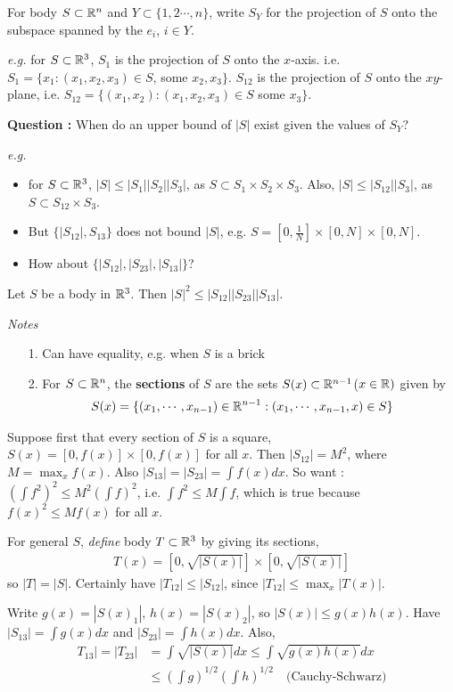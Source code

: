 \documentclass[12pt,a4paper]{report}
\newenvironment{proof}
{\begin{changemargin}{1cm}{0.5cm}
	}%
	{\end{changemargin}
}
\begin{document}
For body $S\subset \mathbb{R}^n$ and $Y\subset \{1,2\cdots, n\}$, write $S_Y$ for the projection of $S$ onto the subspace spanned by the $e_i$, $i\in Y$.

\textit{e.g.} for $S\subset \mathbb{R}^3$, $S_1$ is the projection of $S$ onto the $x$-axis. i.e. $S_1 = \{x_1 : (x_1, x_2, x_3) \in S$, some $x_2, x_3 \}$. $S_{12}$ is the projection of $S$ onto the $xy$-plane, i.e. $S_{12} = \{(x_1, x_2) : (x_1, x_2, x_3) \in S$ some $x_3 \}$.
\s

\textbf{Question :} When do an upper bound of $|S|$ exist given the values of $S_Y$?
\s

\textit{e.g.}
\begin{itemize}
\item for $S\subset \mathbb{R}^3$, $|S|\leq |S_1||S_2||S_3|$, as $S\subset S_1\times S_2\times S_3$. Also, $|S|\leq |S_{12}||S_3|$, as $S\subset S_{12} \times S_3$.
\item But $\{|S_{12}|,S_{13}\}$ does not bound $|S|$, e.g. $S = [0, \frac{1}{N}]\times [0,N]\times [0,N]$.
\item How about $\{|S_{12}|, |S_{23}|,|S_{13}|\}$?
\end{itemize}
\s

 Let $S$ be a body in $\mathbb{R}^3$. Then $|S|^2 \leq |S_{12}||S_{23}||S_{13}|$.
\s

\textit{Notes} 
\begin{itemize}
\item[1.] Can have equality, e.g. when $S$ is a brick
\item[2.] For $S\subset \mathbb{R}^n$, the \textbf{sections} of $S$ are the sets $S(x) \subset \mathbb{R}^{n-1}$($x\in \mathbb{R})$ given by
\begin{align*}
S(x) = \{(x_1, \cdots, x_{n-1})\in \mathbb{R}^{n-1} : (x_1, \cdots, x_{n-1},x)\in S \}
\end{align*}
\end{itemize}
\begin{proof}
\pf Suppose first that every section of $S$ is a square, $S(x) = [0, f(x)] \times [0, f(x)]$ for all $x$. Then $|S_{12}| = M^2$, where $M= \max_{x} f(x)$. Also $|S_{13}| = |S_{23}| = \int f(x) dx$. So want : $(\int f^2)^2 \leq M^2 (\int f)^2$, i.e. $\int f^2 \leq M \int f$, which is true because $f(x)^2 \leq M f(x)$ for all $x$.
\s

For general $S$, \emph{define} body $T\subset \mathbb{R}^3$ by giving its sections,
\begin{align*}
T(x) = [0, \sqrt{|S(x)|}] \times [0, \sqrt{|S(x)|}]
\end{align*}
so $|T| = |S|$. Certainly have $|T_{12}| \leq |S_{12}|$, since $|T_{12}| \leq \max_x |T(x)|$.

\quad Write $g(x) = |S(x)_1|$, $h(x) = |S(x)_2|$, so $|S(x)| \leq g(x) h(x)$. Have $|S_{13}| = \int g(x) dx$ and $|S_{23}|= \int h(x) dx$. Also, 
\begin{align*}
T_{13}|=|T_{23}| &= \int \sqrt{|S(x)|} dx \leq \int \sqrt{g(x)h(x)}dx \\
&\leq (\int g)^{1/2} (\int h)^{1/2} \quad \text{(Cauchy-Schwarz)}
\end{align*}

\eop
\end{proof}
\s
\end{document}
